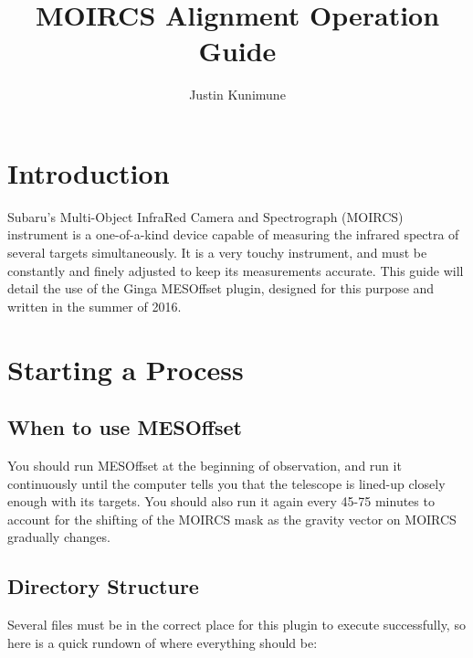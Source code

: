 \documentclass[10pt]{article}
\title{MOIRCS Alignment Operation Guide}
\author{Justin Kunimune}
\begin{document}
\maketitle

\section{Introduction}

Subaru's Multi-Object InfraRed Camera and Spectrograph (MOIRCS) instrument is a one-of-a-kind device capable of measuring the infrared spectra of several targets simultaneously. It is a very touchy instrument, and must be constantly and finely adjusted to keep its measurements accurate. This guide will detail the use of the Ginga MESOffset plugin, designed for this purpose and written in the summer of 2016.

\section{Starting a Process}

\subsection{When to use MESOffset}

You should run MESOffset at the beginning of observation, and run it continuously until the computer tells you that the telescope is lined-up closely enough with its targets. You should also run it again every 45-75 minutes to account for the shifting of the MOIRCS mask as the gravity vector on MOIRCS gradually changes.

\subsection{Directory Structure}

Several files must be in the correct place for this plugin to execute successfully, so here is a quick rundown of where everything should be:

\end{document}
